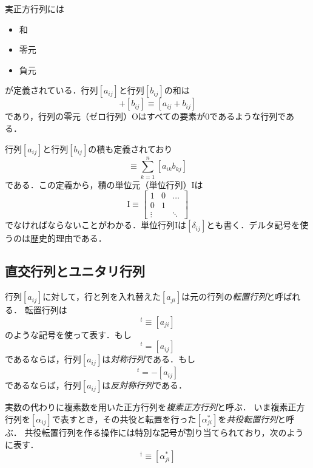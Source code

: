 \documentclass{jsbook}
\newcommand{\keyword}[1]{\emph{#1}}
\newcommand{\zero}{0}%
\newcommand{\Zero}{\mathrm{O}}%
\newcommand{\One}{\mathrm{I}}%
\begin{document}
実正方行列には
\begin{itemize}
\item 和
\item 零元
\item 負元
\end{itemize}
が定義されている．行列$[a_{ij}]$と行列$[b_{ij}]$の和は
\begin{equation}
[a_{ij}]+[b_{ij}]\equiv[a_{ij}+b_{ij}]
\end{equation}
であり，行列の零元（ゼロ行列）$\Zero$はすべての要素が$\zero$であるような行列である．

行列$[a_{ij}]$と行列$[b_{ij}]$の積も定義されており
\begin{equation}
[a_{ij}][b_{ij}]\equiv\sum_{k=1}^n[a_{ik}b_{kj}]
\end{equation}
である．この定義から，積の単位元（単位行列）$\One$は
\begin{equation}
\One\equiv\begin{bmatrix}1&0&\dots\\
  0&1\\
  \vdots&&\ddots\end{bmatrix}
\end{equation}
でなければならないことがわかる．単位行列$\One$は$[\delta_{ij}]$とも書く．デルタ記号を使うのは歴史的理由である．

\subsection{直交行列とユニタリ行列}

行列$[a_{ij}]$に対して，行と列を入れ替えた$[a_{ji}]$は元の行列の\keyword{転置行列}と呼ばれる．
転置行列は
\begin{equation}
[a_{ij}]^t\equiv[a_{ji}]
\end{equation}
のような記号を使って表す．もし
\begin{equation}
[a_{ij}]^t=[a_{ij}]
\end{equation}
であるならば，行列$[a_{ij}]$は\keyword{対称行列}である．もし
\begin{equation}
[a_{ij}]^t=-[a_{ij}]
\end{equation}
であるならば，行列$[a_{ij}]$は\keyword{反対称行列}である．

実数の代わりに複素数を用いた正方行列を\keyword{複素正方行列}と呼ぶ．
いま複素正方行列を$[\alpha_{ij}]$で表すとき，その共役と転置を行った$[\alpha^*_{ji}]$を\keyword{共役転置行列}と呼ぶ．
共役転置行列を作る操作には特別な記号が割り当てられており，次のように表す．
\begin{equation}
[\alpha_{ij}]^\dagger\equiv[\alpha^*_{ji}]
\end{equation}
\end{document}
